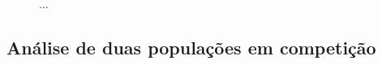 \documentclass{article}
\begin{document}
 	\begin{figure}[h]
 		\centering
 		\qquad
 		\caption{...}
 		\label{fig:TamanhoMax-alpha1-beta1000-D2}
 	\end{figure}

	\subsection{Análise de duas populações em competição}
	

	
\end{document}
